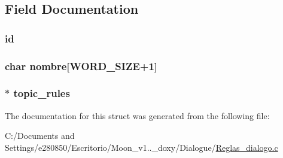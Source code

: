 \subsection{Field Documentation}
\hypertarget{struct___topic_a150a709e86e7134d17cd063de6810b6c}{
\subsubsection[{id}]{ id}}\label{struct___topic_a150a709e86e7134d17cd063de6810b6c}
\hypertarget{struct___topic_a40587fabbfdf0996985f447b11a53856}{
\subsubsection[{nombre}]{\setlength{\rightskip}{0pt plus 5cm}char nombre\mbox{[}{\bf W\+O\+R\+D\+\_\+\+S\+I\+Z\+E}+1\mbox{]}}}\label{struct___topic_a40587fabbfdf0996985f447b11a53856}
\hypertarget{struct___topic_a6faf8080053d28b9a70b08fad369b396}{
\subsubsection[{topic\+\_\+rules}]{$\ast$ topic\+\_\+rules}}\label{struct___topic_a6faf8080053d28b9a70b08fad369b396}


The documentation for this struct was generated from the following file\+:\begin{DoxyCompactItemize}
\item 
C\+:/\+Documents and Settings/e280850/\+Escritorio/\+Moon\+\_\+v1..\+\_\+doxy/\+Dialogue/\hyperlink{_reglas__dialogo_8c}{Reglas\+\_\+dialogo.\+c}\end{DoxyCompactItemize}
